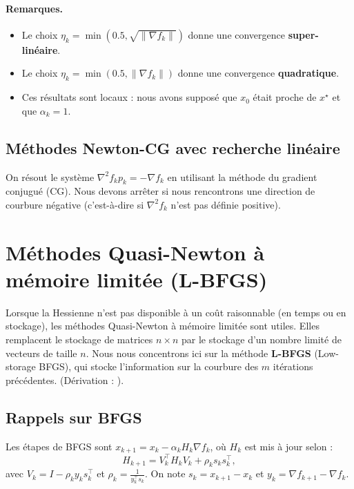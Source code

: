 \paragraph{Remarques.}
\begin{itemize}
    \item Le choix $\eta_k = \min(0.5, \sqrt{\| \nabla f_k \|})$ donne une convergence \textbf{super-linéaire}.
    \item Le choix $\eta_k = \min(0.5, \| \nabla f_k \|)$ donne une convergence \textbf{quadratique}.
    \item Ces résultats sont locaux : nous avons supposé que $x_0$ était proche de $x^\star$ et que $\alpha_k = 1$.
\end{itemize}

\subsection{Méthodes Newton-CG avec recherche linéaire}

On résout le système $\nabla^2 f_k p_k = - \nabla f_k$ en utilisant la méthode du gradient conjugué (CG).
Nous devons arrêter si nous rencontrons une direction de courbure négative (c'est-à-dire si $\nabla^2 f_k$ n'est pas définie positive).

\section{Méthodes Quasi-Newton à mémoire limitée (L-BFGS)}

Lorsque la Hessienne n'est pas disponible à un coût raisonnable (en temps ou en stockage), les méthodes Quasi-Newton à mémoire limitée sont utiles.
Elles remplacent le stockage de matrices $n \times n$ par le stockage d'un nombre limité de vecteurs de taille $n$.
Nous nous concentrons ici sur la méthode \textbf{L-BFGS} (Low-storage BFGS), qui stocke l'information sur la courbure des $m$ itérations précédentes.
(Dérivation : \textit{\cite{nocedal1980updating}}).

\subsection{Rappels sur BFGS}

Les étapes de BFGS sont $x_{k+1} = x_k - \alpha_k H_k \nabla f_k$, où $H_k$ est mis à jour selon :
\begin{equation}
    H_{k+1} = V_k^\top H_k V_k + \rho_k s_k s_k^\top,
\end{equation}
avec $V_k = I - \rho_k y_k s_k^\top$ et $\rho_k = \frac{1}{y_k^\top s_k}$.
On note $s_k = x_{k+1} - x_k$ et $y_k = \nabla f_{k+1} - \nabla f_k$.

